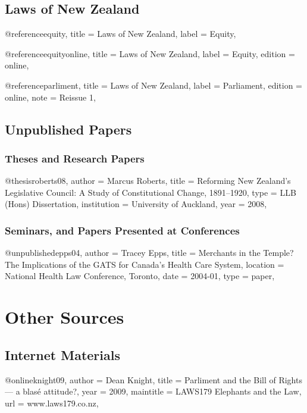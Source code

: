\documentclass{book}
\begin{document}
\section{Laws of New Zealand}
\begin{bib}
@reference{equity,
title = {Laws of New Zealand},
label = {Equity},
}
\end{bib}
\begin{bib}
@reference{equityonline,
title = {Laws of New Zealand},
label = {Equity},
edition = {online},
}
\end{bib}
\begin{bib}
@reference{parliment,
title = {Laws of New Zealand},
label = {Parliament},
edition = {online},
note = {Reissue 1},
}
\end{bib}

\section{Unpublished Papers}

\subsection{Theses and Research Papers}
\begin{bib}
@thesis{roberts08,
author = {Marcus Roberts},
title = {Reforming New Zealand's Legislative Council: A Study of Constitutional Change, 1891--1920},
type = {LLB (Hons) Dissertation},
institution = {University of Auckland},
year = {2008},
}
\end{bib}

\subsection{Seminars, and Papers Presented at Conferences}
\begin{bib}
@unpublished{epps04,
author = {Tracey Epps},
title = {Merchants in the Temple? The Implications of the GATS for Canada's Health Care System},
location = {National Health Law Conference, Toronto},
date = {2004-01},
type = {paper},
}
\end{bib}

\chapter{Other Sources}

\section{Internet Materials}
\begin{bib}
@online{knight09,
author = {Dean Knight},
title = {Parliment and the Bill of Rights --- a blas\'{e} attitude?},
year = {2009},
maintitle = {LAWS179 Elephants and the Law},
url = {www.laws179.co.nz},
}
\end{bib}
\end{document}
